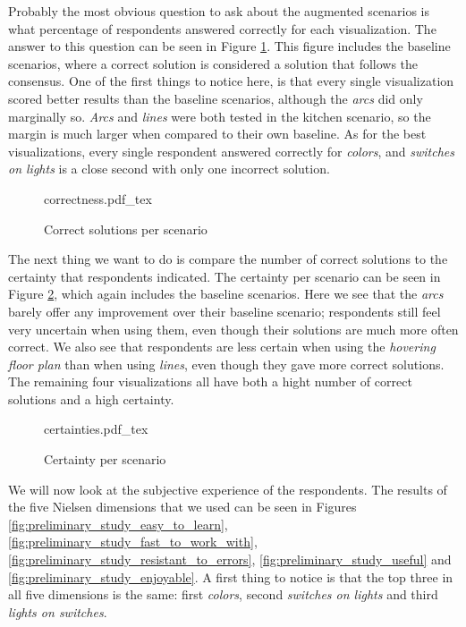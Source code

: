 Probably the most obvious question to ask about the augmented scenarios is what percentage of respondents answered correctly for each visualization. The answer to this question can be seen in Figure \ref{fig:preliminary_study_correctness}. This figure includes the baseline scenarios, where a correct solution is considered a solution that follows the consensus. One of the first things to notice here, is that every single visualization scored better results than the baseline scenarios, although the \textit{arcs} did only marginally so. \textit{Arcs} and \textit{lines} were both tested in the kitchen scenario, so the margin is much larger when compared to their own baseline. As for the best visualizations, every single respondent answered correctly for \textit{colors}, and \textit{switches on lights} is a close second with only one incorrect solution.

\begin{figure}
    \centering
    \def\svgwidth{\columnwidth}
    {correctness.pdf_tex}
    \caption{Correct solutions per scenario}
    \label{fig:preliminary_study_correctness}
\end{figure}

The next thing we want to do is compare the number of correct solutions to the certainty that respondents indicated. The certainty per scenario can be seen in Figure \ref{fig:preliminary_study_certainties}, which again includes the baseline scenarios. Here we see that the \textit{arcs} barely offer any improvement over their baseline scenario; respondents still feel very uncertain when using them, even though their solutions are much more often correct. We also see that respondents are less certain when using the \textit{hovering floor plan} than when using \textit{lines}, even though they gave more correct solutions. The remaining four visualizations all have both a hight number of correct solutions and a high certainty.

\begin{figure}
    \centering
    \def\svgwidth{\columnwidth}
    {certainties.pdf_tex}
    \caption{Certainty per scenario}
    \label{fig:preliminary_study_certainties}
\end{figure}

We will now look at the subjective experience of the respondents. The results of the five Nielsen dimensions that we used can be seen in Figures \ref{fig:preliminary_study_easy_to_learn}, \ref{fig:preliminary_study_fast_to_work_with}, \ref{fig:preliminary_study_resistant_to_errors}, \ref{fig:preliminary_study_useful} and \ref{fig:preliminary_study_enjoyable}. A first thing to notice is that the top three in all five dimensions is the same: first \textit{colors}, second \textit{switches on lights} and third \textit{lights on switches}.

